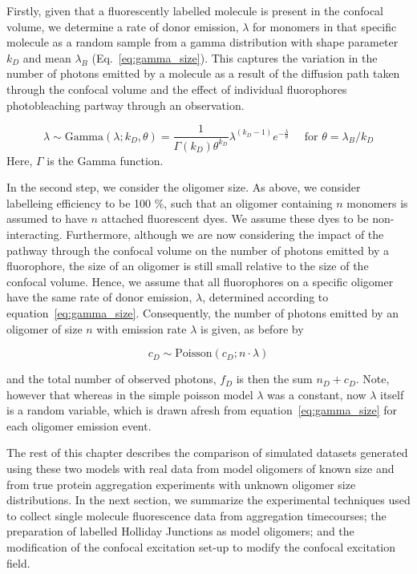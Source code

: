 Firstly, given that a fluorescently labelled molecule is present in the confocal volume, we determine a rate of donor emission, $\lambda$ for monomers in that specific molecule as a random sample from a gamma distribution with shape parameter $k_D$ and mean $\lambda_B$ (Eq.~\ref{eq:gamma_size}). This captures the variation in the number of photons emitted by a molecule as a result of the diffusion path taken through the confocal volume and the effect of individual fluorophores photobleaching partway through an observation.

\begin{equation}
\lambda \sim \text{Gamma}(\lambda; k_D, \theta) =  \frac{1}{\Gamma(k_D) \theta^{k_D}} \lambda^{(k_D - 1)} e^{-\frac{\lambda}{\theta}} \quad\text{ for } \theta = \lambda_B / k_D
\label{eq:gamma_size}
\end{equation} 
Here, $\Gamma$ is the Gamma function. 

In the second step, we consider the oligomer size. As above, we consider labelleing efficiency to be 100 \%, such that an oligomer containing $n$ monomers is assumed to have $n$ attached fluorescent dyes. We assume these dyes to be non-interacting. Furthermore, although we are now considering the impact of the pathway through the confocal volume on the number of photons emitted by a fluorophore, the size of an oligomer is still small relative to the size of the confocal volume. Hence, we assume that all fluorophores on a specific oligomer have the same rate of donor emission, $\lambda$, determined according to equation~\ref{eq:gamma_size}. Consequently, the number of photons emitted by an oligomer of size $n$ with emission rate $\lambda$ is given, as before by

\begin{equation}
c_D \sim \text{Poisson}(c_D; n \cdot \lambda)
\end{equation}  

and the total number of observed photons, $f_D$ is then the sum $n_D + c_D$. Note, however that whereas in the simple poisson model $\lambda$ was a constant, now $\lambda$ itself is a random variable, which is drawn afresh from equation~\ref{eq:gamma_size} for each oligomer emission event.

The rest of this chapter describes the comparison of simulated datasets generated using these two models with real data from model oligomers of known size and from true protein aggregation experiments with unknown oligomer size distributions. In the next section, we summarize the experimental techniques used to collect single molecule fluorescence data from aggregation timecourses; the preparation of labelled Holliday Junctions as model oligomers; and the modification of the confocal excitation set-up to modify the confocal excitation field. 

